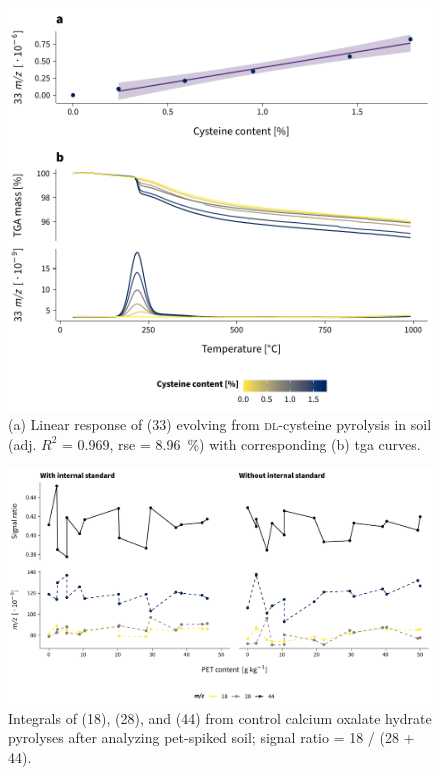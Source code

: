 \begin{figure}
	\includegraphics[width=\textwidth]{figures/cysteine-tests}
	\caption[Linear response of  evolving from \textsc{dl}-cysteine pyrolysis in soil with corresponding \acs{tga} curves.]{(a) Linear response of  (\SI{33}{\mz}) evolving from \textsc{dl}-cysteine pyrolysis in soil (adj. $R^2$ = \num{0.969}, \acs{rse} = \SI{8.96}{\percent}) with corresponding (b) \acs{tga} curves.}
	\label{fig:cysteine-tests}
	\forceversofloat
\end{figure}

\begin{figure}
	\includegraphics[width=\textwidth]{figures/control-measurements}
	\caption[Integrals of , , and  from control calcium oxalate hydrate pyrolyses after analyzing \ac{pet}-spiked soil.]{Integrals of  (\SI{18}{\mz}),  (\SI{28}{\mz}), and  (\SI{44}{\mz}) from control calcium oxalate hydrate pyrolyses after analyzing \acs{pet}-spiked soil; signal ratio = \SI{18}{\mz} / (\SI{28}{\mz} + \SI{44}{\mz}).}
	\label{fig:control-measurements}
	\forceversofloat
\end{figure}

